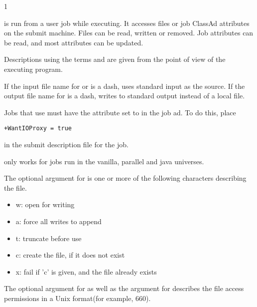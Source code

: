 \begin{ManPage}{\label{man-condor-chirp}}{1}
   

  

   

\Description 
{}
 is run from a user job while executing.
It accesses files or job ClassAd attributes on the submit machine.
Files can be read, written or removed.
Job attributes can be read, and most attributes can be updated.

Descriptions using the terms  and 
are given from the point of view of the executing program.

If the input file name for  or  is a dash,
 uses standard input as the source.
If the output file name for  is a dash,
 writes to standard output instead of a local file.

Jobs that use  must have the attribute
 set to  in the job ad.
To do this, place
\begin{verbatim}
+WantIOProxy = true
\end{verbatim}
in the submit description file for the job.

 only works for jobs run in the
vanilla, parallel and java universes.

The optional  argument for 
is one or more of the following characters describing the
 file.
  \begin{itemize}
    \item{w:  open for writing}
    \item{a:  force all writes to append}
    \item{t:  truncate before use}
    \item{c:  create the file, if it does not exist}
    \item{x:  fail if 'c' is given, and the file already exists}
  \end{itemize}

The optional  argument for  as well as the
 argument for  describes the file access permissions
in a Unix format(for example, 660).


\end{ManPage}
